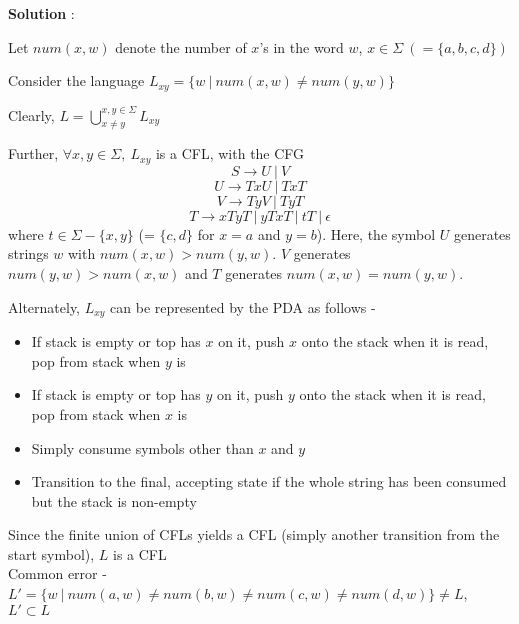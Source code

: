 \documentclass{article}
\begin{document}
    \textbf{Solution} :
    
    Let $num(x, w)$ denote the number of $x$'s in the word $w$, $x \in \Sigma ~(= \{ a, b, c, d\})$
    
    Consider the language $L_{xy} = \{w ~|~ num(x, w) \neq num(y, w) \}$
    
    Clearly, $L = \bigcup_{x \neq y}^{x, y \in \Sigma}L_{xy}$
    
    Further, $\forall x, y \in \Sigma, ~L_{xy}$ is a CFL, with the CFG
    $$S \rightarrow U ~|~ V$$
    $$U \rightarrow TxU ~|~ TxT$$
    $$V \rightarrow TyV ~|~ TyT$$
    $$T \rightarrow xTyT ~|~ yTxT ~|~ tT ~|~ \epsilon $$
    where $t \in \Sigma - \{x, y\}$ (= $\{c, d\}$ for $x = a$ and $y= b$). Here, the symbol $U$ generates strings $w$ with $num(x, w) > num(y, w)$. $V$ generates $num(y, w) > num(x, w)$ and $T$ generates $num(x, w) = num(y, w)$. 
    
    Alternately, $L_{xy}$ can be represented by the PDA as follows - 
    \begin{itemize}
        \item If stack is empty or top has $x$ on it, push $x$ onto the stack when it is read, pop from stack when $y$ is
        \item If stack is empty or top has $y$ on it, push $y$ onto the stack when it is read, pop from stack when $x$ is
        \item Simply consume symbols other than $x$ and $y$
        \item Transition to the final, accepting state if the whole string has been consumed but the stack is non-empty
    \end{itemize}
    
    
    
    Since the finite union of CFLs yields a CFL (simply another transition from the start symbol), $L$ is a CFL\\
    
    Common error - $L' = \{w ~|~ num(a, w) \neq num(b, w) \neq num(c,w) \neq num(d,w) \} \neq L$, $L' \subset L$ 
    
\end{document}

